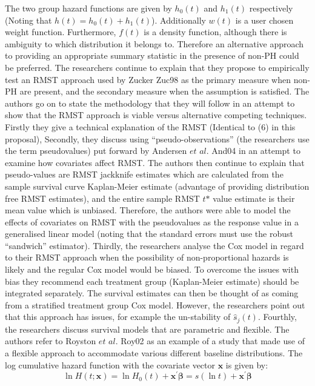 \documentclass[12pt,twoside]{reedthesis}
\begin{document}
The two group hazard functions are given by \(h_{0}(t)\) and \(h_{1}(t)\) respectively (Noting that \(h(t)=h_{0}(t)+h_{1}(t)\)). Additionally \(w(t)\) is a user chosen weight function. Furthermore, \(f(t)\) is a density function, although there is ambiguity to which distribution it belongs to.
Therefore an alternative approach to providing an appropriate summary statistic in the presence of non-PH could be preferred. The researchers continue to explain that they propose to empirically test an RMST approach used by Zucker Zuc98 as the primary measure when non-PH are present, and the secondary measure when the assumption is satisfied.
The authors go on to state the methodology that they will follow in an attempt to show that the RMST approach is viable versus alternative competing techniques.
Firstly they give a technical explanation of the RMST (Identical to (6) in this proposal), Secondly, they discuss using ``pseudo-observations'' (the researchers use the term pseudovalues) put forward by Andersen \(\textit{et al.}\) And04 in an attempt to examine how covariates affect RMST. The authors then continue to explain that pseudo-values are RMST jackknife estimates which are calculated from the sample survival curve Kaplan-Meier estimate (advantage of providing distribution free RMST estimates), and the entire sample RMST \(\textit{t*}\) value estimate is their mean value which is unbiased. Therefore, the authors were able to model the effects of covariates on RMST with the pseudovalues as the response value in a generalised linear model (noting that the standard errors must use the robust ``sandwich'' estimator). Thirdly, the researchers analyse the Cox model in regard to their RMST approach when the possibility of non-proportional hazards is likely and the regular Cox model would be biased. To overcome the issues with bias they recommend each treatment group (Kaplan-Meier estimate) should be integrated separately.
The survival estimates can then be thought of as coming from a stratified treatment group Cox model. However, the researchers point out that this approach has issues, for example the un-stability of \(\widehat{s}_{j}(t)\).
Fourthly, the researchers discuss survival models that are parametric and flexible. The authors refer to Royston \(\textit{et al.}\) Roy02 as an example of a study that made use of a flexible approach to accommodate various different baseline distributions. The log cumulative hazard function with the covariate vector \(\mathbf{x}\) is given by:
\[\ln H(t ; \mathbf{x})=\ln H_{0}(t)+\mathbf{x}^{\prime} \boldsymbol{\beta}=s(\ln t)+\mathbf{x}^{\prime} \boldsymbol{\beta}\]
\end{document}

